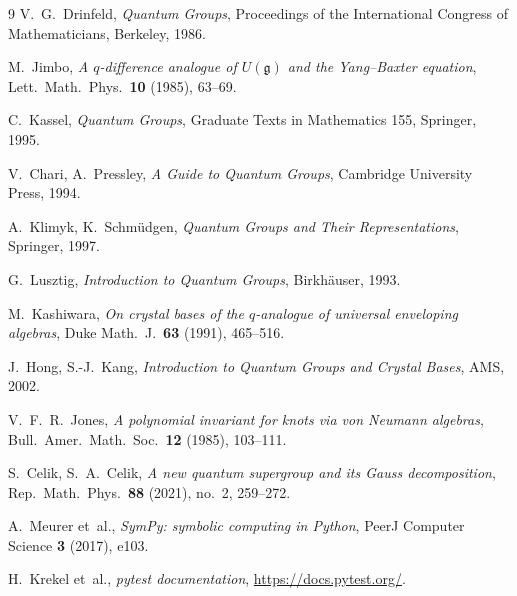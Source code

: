 \documentclass[10pt]{math}
\numberwithin{equation}{section}
\theoremstyle{plain}
\theoremstyle{definition}
\newcommand{\gfrak}{\mathfrak{g}}
\begin{document}
\FloatBarrier
\begin{thebibliography}{9}
V.~G.~Drinfeld, \emph{Quantum Groups}, Proceedings of the International Congress of Mathematicians, Berkeley, 1986.

M.~Jimbo, \emph{A $q$-difference analogue of $U(\gfrak)$ and the Yang--Baxter equation}, Lett.\ Math.\ Phys.\ \textbf{10} (1985), 63--69.

C.~Kassel, \emph{Quantum Groups}, Graduate Texts in Mathematics 155, Springer, 1995.

V.~Chari, A.~Pressley, \emph{A Guide to Quantum Groups}, Cambridge University Press, 1994.

A.~Klimyk, K.~Schm{\"u}dgen, \emph{Quantum Groups and Their Representations}, Springer, 1997.

G.~Lusztig, \emph{Introduction to Quantum Groups}, Birkh{\"a}user, 1993.

M.~Kashiwara, \emph{On crystal bases of the $q$-analogue of universal enveloping algebras}, Duke Math.\ J.\ \textbf{63} (1991), 465--516.

J.~Hong, S.-J.~Kang, \emph{Introduction to Quantum Groups and Crystal Bases}, AMS, 2002.

V.~F.~R.~Jones, \emph{A polynomial invariant for knots via von Neumann algebras}, Bull.\ Amer.\ Math.\ Soc.\ \textbf{12} (1985), 103--111.

S.~Celik, S.~A.~Celik, \emph{A new quantum supergroup and its Gauss decomposition}, Rep.\ Math.\ Phys.\ \textbf{88} (2021), no.~2, 259--272.

A.~Meurer et~al., \emph{SymPy: symbolic computing in Python}, PeerJ Computer Science \textbf{3} (2017), e103.

H.~Krekel et~al., \emph{pytest documentation}, \url{https://docs.pytest.org/}.
\end{thebibliography}
\end{document}

